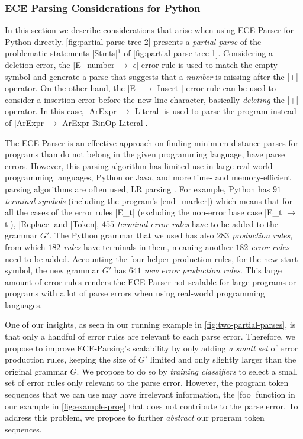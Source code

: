
\subsubsection{ECE Parsing Considerations for Python}
In this section we describe considerations that arise when using ECE-Parser for
Python directly. \autoref{fig:partial-parse-tree-2} presents a \emph{partial
parse} of the problematic statements |Stmts|$^1$ of
\autoref{fig:partial-parse-tree-1}. Considering a deletion error, the
%
|E_number $\rightarrow$ $\epsilon$| error rule is used to match the empty symbol
and generate a parse that suggests that a \emph{number} is missing after the |+|
operator. On the other hand, the
%
|E_\n $\rightarrow$ Insert \n| error rule can be used to consider a insertion
error before the new line character, basically \emph{deleting} the |+| operator.
In this case, |ArExpr $\rightarrow$ Literal| is used to parse the program
instead of |ArExpr $\rightarrow$ ArExpr BinOp Literal|.

The ECE-Parser is an effective approach on finding minimum distance parses for
programs than do not belong in the given programming language, \ie have parse
errors. However, this parsing algorithm has limited use in large real-world
programming languages, \eg Python or Java, and more time- and memory-efficient
parsing algorithms are often used, \eg LR parsing \etc \citep{Knuth_1965,
Chapman_1987}. For example, Python has \emph{$91$ terminal symbols} (including
the program's |end_marker|) which means that for all the cases of the error
rules |E_t| (excluding the non-error base case |E_t $\rightarrow$ t|), |Replace|
and |Token|, \emph{$455$ terminal error rules} have to be added to the grammar
$G'$. The Python grammar that we used has also \emph{$283$ production rules},
from which \emph{$182$ rules} have terminals in them, meaning another
\emph{$182$ error rules} need to be added. Accounting the four helper production
rules, \eg for the new start symbol, the new grammar $G'$ has \emph{$641$ new
error production rules}. This large amount of error rules renders the ECE-Parser
not scalable for large programs or programs with a lot of parse errors when
using real-world programming languages.

One of our insights,
as seen in our running example in \autoref{fig:two-partial-parses}, is that only
a handful of error rules are relevant to each parse error. Therefore, we
propose to improve ECE-Parsing's scalability by only adding \emph{a
small set} of error production rules, \ie keeping the size of $G'$ limited and
only slightly larger than the original grammar $G$. We propose to do so by
\emph{training classifiers} to select a small set of error rules only relevant
to the parse error. However, the program token sequences that we can use
may have irrelevant information, \eg the |foo| function in our example in
\autoref{fig:example-prog} that does not contribute to the parse error. To
address this problem, we propose to further \emph{abstract} our program token
sequences.

